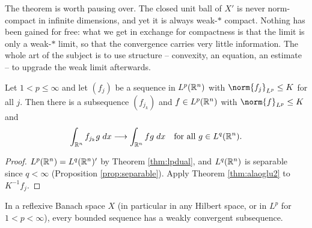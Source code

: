 \documentclass[a4paper]{scrartcl}
\newcommand{\wsto}{\overset{*}{\rightharpoonup}}
\begin{document}
The theorem is worth pausing over. The closed unit ball of $X'$ is never norm-compact in infinite dimensions, and yet it is always weak-$*$ compact. Nothing has been gained for free: what we get in exchange for compactness is that the limit is only a weak-$*$ limit, so that the convergence carries very little information. The whole art of the subject is to use structure -- convexity, an equation, an estimate -- to upgrade the weak limit afterwards.

\begin{center}
\end{center}

\begin{corollary}\label{cor:weakcompactlp}
	Let $1 < p \le \infty$ and let $(f_j)$ be a sequence in $L^p(\mathbb{R}^n)$ with $\norm{f_j}_{L^p}\le K$ for all $j$. Then there is a subsequence $(f_{j_k})$ and $f \in L^p(\mathbb{R}^n)$ with $\norm{f}_{L^p}\le K$ and
	$$\int_{\mathbb{R}^n} f_{j_k} g \; d x \longrightarrow \int_{\mathbb{R}^n} fg \; d x \quad \text{for all } g \in L^q(\mathbb{R}^n).$$
\end{corollary}

\begin{proof}
	$L^p(\mathbb{R}^n) = L^q(\mathbb{R}^n)'$ by Theorem \ref{thm:lpdual}, and $L^q(\mathbb{R}^n)$ is separable since $q < \infty$ (Proposition \ref{prop:separable}). Apply Theorem \ref{thm:alaoglu2} to $K^{-1}f_j$.
\end{proof}

\begin{corollary}\label{cor:reflexiveweak}
	In a reflexive Banach space $X$ (in particular in any Hilbert space, or in $L^p$ for $1<p<\infty$), every bounded sequence has a weakly convergent subsequence.
\end{corollary}
\end{document}
